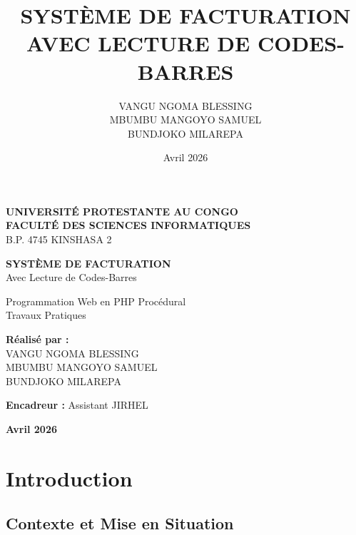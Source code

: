 \documentclass[12pt,a4paper]{report}
\title{\textbf{SYSTÈME DE FACTURATION \\ AVEC LECTURE DE CODES-BARRES}}
\author{VANGU NGOMA BLESSING \\ MBUMBU MANGOYO SAMUEL \\ BUNDJOKO MILAREPA}
\date{Avril 2026}
\begin{document}
\begin{titlepage}
    \centering
    \vspace*{1cm}
    
    {\Large \textbf{UNIVERSITÉ PROTESTANTE AU CONGO} \\}
    {\large \textbf{FACULTÉ DES SCIENCES INFORMATIQUES} \\}
    {\large B.P. 4745 KINSHASA 2 \\}
    
    \vspace*{3cm}
    
    {\LARGE \textbf{SYSTÈME DE FACTURATION} \\}
    {\large Avec Lecture de Codes-Barres \\}
    
    \vspace*{2cm}
    
    {\large Programmation Web en PHP Procédural \\}
    {\large Travaux Pratiques \\}
    
    \vspace*{4cm}
    
    {\large \textbf{Réalisé par :} \\}
    {\normalsize VANGU NGOMA BLESSING \\}
    {\normalsize MBUMBU MANGOYO SAMUEL \\}
    {\normalsize BUNDJOKO MILAREPA \\}
    
    \vspace*{5cm}
    
    \raggedleft
    {\large \textbf{Encadreur :} Assistant JIRHEL \\}
    
    \vspace*{3cm}
    
    \centering
    {\large \textbf{Avril 2026}}
    
\end{titlepage}

\newpage
\tableofcontents
\newpage

\chapter{Introduction}

\section{Contexte et Mise en Situation}
\end{document}
